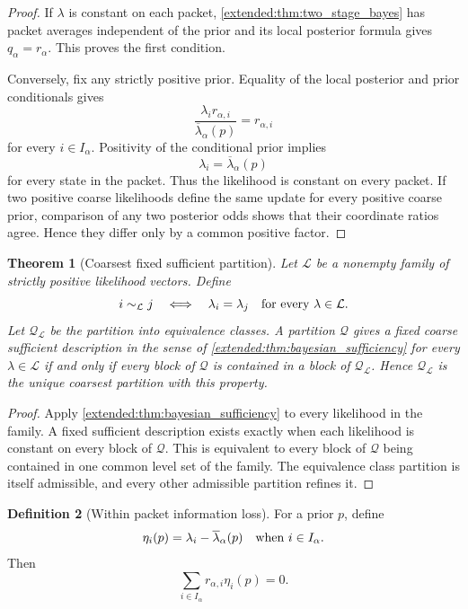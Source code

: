 \documentclass[11pt,a4paper]{article}
\newtheorem{theorem}{Theorem}[section]
\theoremstyle{definition}
\newtheorem{definition}[theorem]{Definition}
\theoremstyle{remark}
\begin{document}
\begin{proof}
If \(\lambda\) is constant on each packet, \cref{extended:thm:two_stage_bayes} has packet averages independent of the prior and its local posterior formula gives \(q_\alpha=r_\alpha\). This proves the first condition.

Conversely, fix any strictly positive prior. Equality of the local posterior and prior conditionals gives
\[
\frac{\lambda_i r_{\alpha,i}}
{\overline\lambda_\alpha(p)}
=
r_{\alpha,i}
\]
for every \(i\in I_\alpha\). Positivity of the conditional prior implies
\[
\lambda_i=\overline\lambda_\alpha(p)
\]
for every state in the packet. Thus the likelihood is constant on every packet. If two positive coarse likelihoods define the same update for every positive coarse prior, comparison of any two posterior odds shows that their coordinate ratios agree. Hence they differ only by a common positive factor.
\end{proof}

\begin{theorem}[Coarsest fixed sufficient partition]\label{extended:record:051}\label{extended:thm:coarsest_bayesian_partition}
Let \(\mathcal L\) be a nonempty family of strictly positive likelihood vectors. Define
\[
i\sim_{\mathcal L}j
\quad\Longleftrightarrow\quad
\lambda_i=\lambda_j
\quad\hbox{for every }\lambda\in\mathcal L.
\]
Let \(\mathcal Q_{\mathcal L}\) be the partition into equivalence classes. A partition \(\mathcal Q\) gives a fixed coarse sufficient description in the sense of \cref{extended:thm:bayesian_sufficiency} for every \(\lambda\in\mathcal L\) if and only if every block of \(\mathcal Q\) is contained in a block of \(\mathcal Q_{\mathcal L}\). Hence \(\mathcal Q_{\mathcal L}\) is the unique coarsest partition with this property.
\end{theorem}

\begin{proof}
Apply \cref{extended:thm:bayesian_sufficiency} to every likelihood in the family. A fixed sufficient description exists exactly when each likelihood is constant on every block of \(\mathcal Q\). This is equivalent to every block of \(\mathcal Q\) being contained in one common level set of the family. The equivalence class partition is itself admissible, and every other admissible partition refines it.
\end{proof}

\begin{definition}[Within packet information loss]\label{extended:record:052}
For a prior \(p\), define
\[
\eta_i(p)
=
\lambda_i-\overline\lambda_\alpha(p)
\quad\hbox{when }i\in I_\alpha.
\]
Then
\[
\sum_{i\in I_\alpha}r_{\alpha,i}\eta_i(p)=0.
\]
\end{definition}
\end{document}
